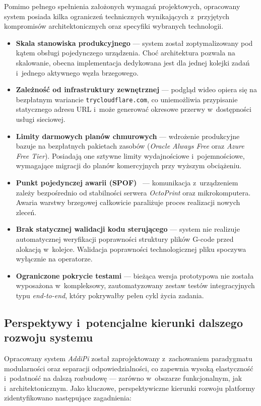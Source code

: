 \documentclass[a4paper,12pt,reqno]{article}
\begin{document}
Pomimo pełnego spełnienia założonych wymagań projektowych, opracowany system posiada kilka ograniczeń technicznych wynikających z~przyjętych kompromisów architektonicznych oraz specyfiki wybranych technologii.

\begin{itemize}
	\item \textbf{Skala stanowiska produkcyjnego} --- system został zoptymalizowany pod kątem obsługi pojedynczego urządzenia. Choć architektura pozwala na skalowanie, obecna implementacja dedykowana jest dla jednej kolejki zadań i~jednego aktywnego węzła brzegowego.
	\item \textbf{Zależność od infrastruktury zewnętrznej} --- podgląd wideo opiera się na bezpłatnym wariancie \texttt{trycloudflare.com}, co uniemożliwia przypisanie statycznego adresu URL i~może generować okresowe przerwy w~dostępności usługi sieciowej.
	\item \textbf{Limity darmowych planów chmurowych} --- wdrożenie produkcyjne bazuje na bezpłatnych pakietach zasobów (\textit{Oracle Always Free} oraz \textit{Azure Free Tier}). Posiadają one sztywne limity wydajnościowe i~pojemnościowe, wymagające migracji do planów komercyjnych przy wyższym obciążeniu.
	\item \textbf{Punkt pojedynczej awarii (SPOF)}~\cite{kleppmann2017} --- komunikacja z~urządzeniem zależy bezpośrednio od stabilności serwera \textit{OctoPrint} oraz mikrokomputera. Awaria warstwy brzegowej całkowicie paraliżuje proces realizacji nowych zleceń.
	\item \textbf{Brak statycznej walidacji kodu sterującego} --- system nie realizuje automatycznej weryfikacji poprawności struktury plików G-code przed alokacją w~kolejce. Walidacja poprawności technologicznej pliku spoczywa wyłącznie na operatorze.
	\item \textbf{Ograniczone pokrycie testami} --- bieżąca wersja prototypowa nie została wyposażona w~kompleksowy, zautomatyzowany zestaw testów integracyjnych typu \textit{end-to-end}, który pokrywałby pełen cykl życia zadania.
\end{itemize}



\subsection{Perspektywy i~potencjalne kierunki dalszego rozwoju systemu}

Opracowany system \textit{AddiPi} został zaprojektowany z~zachowaniem paradygmatu modularności oraz separacji odpowiedzialności, co zapewnia wysoką elastyczność i~podatność na dalszą rozbudowę --- zarówno w~obszarze funkcjonalnym, jak i~architektonicznym. Jako kluczowe, perspektywiczne kierunki rozwoju platformy zidentyfikowano następujące zagadnienia:
\end{document}
